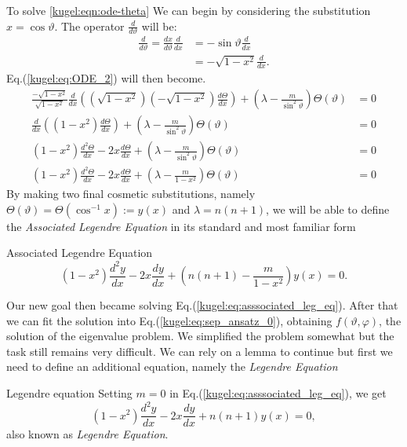 To solve \eqref{kugel:eqn:ode-theta}
We can begin by considering the substitution $x = \cos \vartheta$. The operator $\frac{d}{d \vartheta}$ will be:
\begin{align*}
    \frac{d}{d \vartheta} = \frac{dx}{d \vartheta}\frac{d}{dx} &= -\sin \vartheta \frac{d}{dx} \\
    &= -\sqrt{1-x^2} \frac{d}{dx}.
\end{align*} 
Eq.(\ref{kugel:eq:ODE_2}) will then become.
\begin{align*}
   \frac{-\sqrt{1-x^2}}{\sqrt{1-x^2}} \frac{d}{dx} \left( \left(\sqrt{1-x^2}\right) \left(-\sqrt{1-x^2}\right) \frac{d \Theta}{dx} \right) + \left( \lambda - \frac{m}{\sin^2 \vartheta} \right)\Theta(\vartheta) &= 0 \\
   \frac{d}{dx} \left( (1-x^2) \frac{d \Theta}{dx} \right) + \left( \lambda - \frac{m}{\sin^2 \vartheta} \right)\Theta(\vartheta) &= 0 \\
   (1-x^2)\frac{d^2 \Theta}{dx} - 2x\frac{d \Theta}{dx} + \left( \lambda - \frac{m}{\sin^2 \vartheta} \right)\Theta(\vartheta) &= 0 \\
   (1-x^2)\frac{d^2 \Theta}{dx} - 2x\frac{d \Theta}{dx} + \left( \lambda - \frac{m}{1-x^2} \right)\Theta(\vartheta) &= 0 
\end{align*}
By making two final cosmetic substitutions, namely $\Theta(\vartheta)=\Theta(\cos^{-1}x):=y(x)$ and $\lambda=n(n+1)$, we will be able to define the \emph{Associated Legendre Equation} in its standard and most familiar form
\begin{definition}{Associated Legendre Equation}
    \begin{equation}\label{kugel:eq:associated_leg_eq}
        (1-x^2)\frac{d^2 y}{dx} - 2x\frac{d y}{dx} + \left( n(n+1) - \frac{m}{1-x^2} \right)y(x) = 0. 
    \end{equation}
\end{definition}
Our new goal then became solving Eq.(\ref{kugel:eq:asssociated_leg_eq}). After that we can fit the solution into Eq.(\ref{kugel:eq:sep_ansatz_0}), obtaining $f(\vartheta, \varphi)$, the solution of the eigenvalue problem. \newline
We simplified the problem somewhat but the task still remains very difficult. We can rely on a lemma to continue but first we need to define an additional equation, namely the \emph{Legendre Equation}
\begin{definition}{Legendre equation}\newline
    Setting $m=0$ in Eq.(\ref{kugel:eq:asssociated_leg_eq}), we get
    \begin{equation}\label{kugel:eq:leg_eq}
        (1-x^2)\frac{d^2 y}{dx} - 2x\frac{d y}{dx} + n(n+1)y(x) = 0,
    \end{equation}
    also known as \emph{Legendre Equation}.
\end{definition}
